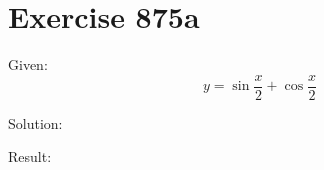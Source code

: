 \documentclass[a4paper, 10pt]{scrartcl}
\begin{document}
\section{Exercise 875a}

Given:
\[
y = \sin{\frac{x}{2}} + \cos{\frac{x}{2}}
\]

Solution:

Result:
\end{document}
